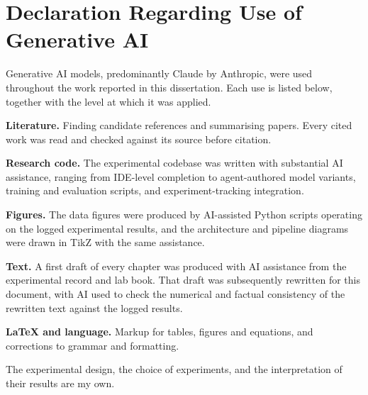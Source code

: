 \section{Declaration Regarding Use of Generative AI}
\label{sec_intro_ai}

Generative AI models, predominantly Claude by Anthropic, were used throughout the work reported in
this dissertation. Each use is listed below, together with the level at which it was applied.

\begin{compactitem}
\item \textbf{Literature.} Finding candidate references and summarising papers.
    Every cited work was read and checked against its source before citation.
\item \textbf{Research code.} The experimental codebase was written with substantial AI assistance,
    ranging from IDE-level completion to agent-authored model variants, training and evaluation
    scripts, and experiment-tracking integration.
\item \textbf{Figures.} The data figures were produced by AI-assisted Python scripts operating on the
    logged experimental results, and the architecture and pipeline diagrams were drawn in TikZ with
    the same assistance.
\item \textbf{Text.} A first draft of every chapter was produced with AI assistance from the
    experimental record and lab book. That draft was subsequently rewritten for this document, with
    AI used to check the numerical and factual consistency of the rewritten text against the logged
    results.
\item \textbf{LaTeX and language.} Markup for tables, figures and equations, and corrections to
    grammar and formatting.
\end{compactitem}

The experimental design, the choice of experiments, and the interpretation of their results are my own.